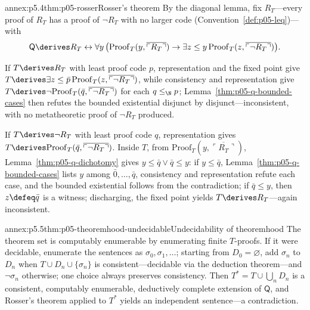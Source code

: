 \begin{annexitem}{annex:p5.4}{thm:p05-rosser}{Rosser's theorem}
By the diagonal lemma, fix \(R_T\)---every proof of \(R_T\) has a proof
of \(\neg R_T\) with no larger code (Convention~\ref{def:p05-leq})---with
\[
  \mathsf Q\derives R_T\leftrightarrow\forall y\,\bigl(
  \mathrm{Proof}_T(y,\overline{\ulcorner R_T\urcorner})\to
  \exists z\leq y\,
  \mathrm{Proof}_T(z,\overline{\ulcorner\neg R_T\urcorner})\bigr).
\]

If \(T\derives R_T\) with least proof code \(p\), representation and
the fixed point give \(T\derives\exists z\leq\bar p\,
\mathrm{Proof}_T(z,\overline{\ulcorner\neg R_T\urcorner})\), while
consistency and representation give
\(T\derives\neg\mathrm{Proof}_T(\bar q,\overline{\ulcorner\neg
R_T\urcorner})\) for each \(q\leq_{\N}p\);
Lemma~\ref{thm:p05-q-bounded-cases} then refutes the bounded
existential disjunct by disjunct---inconsistent, with no metatheoretic
proof of \(\neg R_T\) produced.

If \(T\derives\neg R_T\) with least proof code \(q\), representation
gives \(T\derives\mathrm{Proof}_T(\bar q,\overline{\ulcorner\neg
R_T\urcorner})\).  Inside \(T\), from
\(\mathrm{Proof}_T(y,\overline{\ulcorner R_T\urcorner})\),
Lemma~\ref{thm:p05-q-dichotomy} gives \(y\leq\bar q\lor\bar q\leq y\):
if \(y\leq\bar q\), Lemma~\ref{thm:p05-q-bounded-cases} lists \(y\)
among \(\bar0,\ldots,\bar q\), consistency and representation refute
each case, and the bounded existential follows from the contradiction;
if \(\bar q\leq y\), then \(z\defeq\bar q\) is a witness; discharging,
the fixed point yields \(T\derives R_T\)---again inconsistent.
\end{annexitem}

\begin{annexitem}{annex:p5.5}{thm:p05-theoremhood-undecidable}{Undecidability of theoremhood}
The theorem set is computably enumerable by enumerating finite
\(T\)-proofs.  If it were decidable, enumerate the sentences as
\(\sigma_0,\sigma_1,\ldots\); starting from \(D_0=\varnothing\), add
\(\sigma_n\) to \(D_n\) when \(T\cup D_n\cup\{\sigma_n\}\) is
consistent---decidable via the deduction theorem---and \(\neg\sigma_n\)
otherwise; one choice always preserves consistency.  Then
\(T^*=T\cup\bigcup_nD_n\) is a consistent, computably enumerable,
deductively complete extension of \(\mathsf Q\), and Rosser's theorem
applied to \(T^*\) yields an independent sentence---a contradiction.
\end{annexitem}

